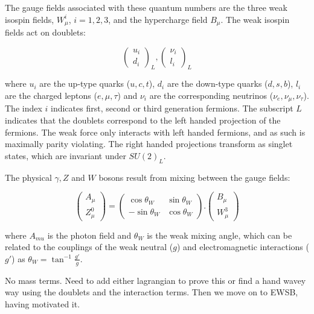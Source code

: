 The gauge fields associated with these quantum numbers are the three weak isospin fields,
$W_{\mu}^{i}$, $i = 1,2,3$, and the hypercharge field $B_{\mu}$. The weak
isospin fields act on doublets: 

\begin{equation}
\begin{pmatrix} u_{i} \\ d_{i} \end{pmatrix}_{L} ,   
\begin{pmatrix} \nu_{i} \\ {l_{i}} \end{pmatrix}_{L}
\end{equation}

where $u_{i}$ are the up-type quarks ($u,c,t$), $d_{i}$ are the down-type quarks
($d,s,b$), $l_{i}$ are the charged leptons ($e,\mu,\tau$) and $\nu_{i}$ are the
corresponding neutrinos ($\nu_{e},\nu_{\mu},\nu_{\tau}$). The index $i$ indicates first, second or third
generation fermions. The subscript $L$ indicates that the doublets correspond to
the left handed projection of the fermions. The weak force only interacts with
left handed fermions, and as such is maximally parity violating. The right handed projections
transform as singlet states, which are invariant under $SU(2)_{L}$.

The physical $\gamma, Z$ and $W$ bosons result from mixing between the gauge
fields:

\begin{equation}
\begin{pmatrix} A_{\mu} \\ Z_{\mu}^{0} \end{pmatrix} = 
\begin{pmatrix} \cos{\theta_{W}} & \sin{\theta_{W}} \\ -\sin{\theta_{W}} &
\cos{\theta_{W}} \end{pmatrix} . 
\begin{pmatrix} B_{\mu} \\ W_{\mu}^{3} \end{pmatrix}
\end{equation}

where $A_{mu}$ is the photon field and $\theta_{W}$ is the weak mixing angle,
which can be related to the couplings of the weak neutral ($g$) and electromagnetic
interactions ($g'$) as $\theta_{W}=\tan^{-1}{\frac{g'}{g}}$. 

No mass terms. Need to add either lagrangian to prove this or find a hand wavey
way using the doublets and the interaction terms. Then we move on to EWSB,
having motivated it.

